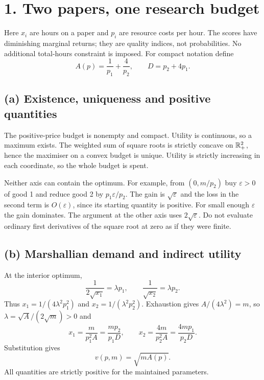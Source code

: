 \documentclass[11pt,a4paper]{article}
\begin{document}
\clearpage
\section*{1. Two papers, one research budget}
Here $x_i$ are hours on a paper and $p_i$ are resource costs per hour.
The scores have diminishing marginal returns; they are quality indices,
not probabilities. No additional total-hours constraint is imposed.
For compact notation define
\[
 A(p)=\frac1{p_1}+\frac4{p_2},\qquad D=p_2+4p_1.
\]
\subsection*{(a) Existence, uniqueness and positive quantities}
The positive-price budget is nonempty and compact. Utility is continuous, so
a maximum exists. The weighted sum of square roots is strictly concave on
$\mathbb R_+^2$, hence the maximiser on a convex budget is unique. Utility is
strictly increasing in each coordinate, so the whole budget is spent.

Neither axis can contain the optimum. For example, from
$(0,m/p_2)$ buy $\varepsilon>0$ of good 1 and reduce good 2 by
$p_1\varepsilon/p_2$. The gain is $\sqrt{\varepsilon}$ and the loss in the
second term is $O(\varepsilon)$, since its starting quantity is positive.
For small enough $\varepsilon$ the gain dominates. The argument at the other
axis uses $2\sqrt{\varepsilon}$. Do not evaluate ordinary first derivatives
of the square root at zero as if they were finite.

\subsection*{(b) Marshallian demand and indirect utility}
At the interior optimum,
\[
 \frac1{2\sqrt{x_1}}=\lambda p_1,\qquad
 \frac1{\sqrt{x_2}}=\lambda p_2.
\]
Thus $x_1=1/(4\lambda^2p_1^2)$ and
$x_2=1/(\lambda^2p_2^2)$. Exhaustion gives
$A/(4\lambda^2)=m$, so $\lambda=\sqrt A/(2\sqrt m)>0$ and
\[
 \boxed{x_1=\frac{m}{p_1^2A}=\frac{mp_2}{p_1D}},\qquad
 \boxed{x_2=\frac{4m}{p_2^2A}=\frac{4mp_1}{p_2D}}.
\]
Substitution gives
\[
 \boxed{v(p,m)=\sqrt{mA(p)}}.
\]
All quantities are strictly positive for the maintained parameters.
\end{document}
